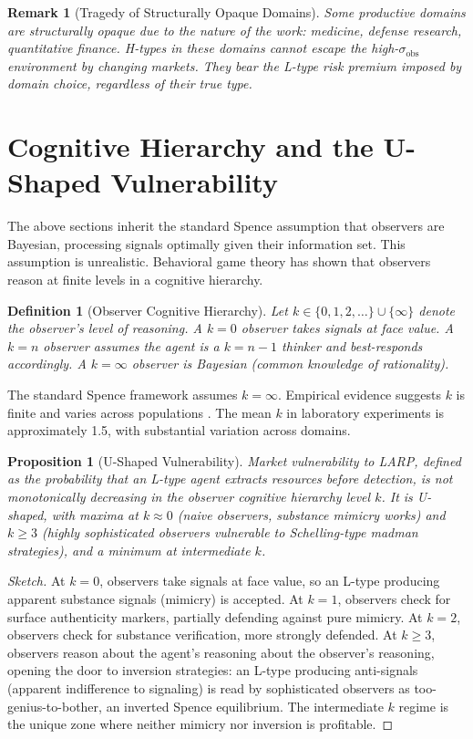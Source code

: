 \documentclass[11pt]{article}
\newtheorem{definition}{Definition}
\newtheorem{remark}{Remark}
\newtheorem{proposition}{Proposition}
\begin{document}
\begin{remark}[Tragedy of Structurally Opaque Domains]
Some productive domains are structurally opaque due to the nature of the work: medicine, defense research, quantitative finance. H-types in these domains cannot escape the high-$\sigma_{\mathrm{obs}}$ environment by changing markets. They bear the L-type risk premium imposed by domain choice, regardless of their true type.
\end{remark}

\section{Cognitive Hierarchy and the U-Shaped Vulnerability}

The above sections inherit the standard Spence assumption that observers are Bayesian, processing signals optimally given their information set. This assumption is unrealistic. Behavioral game theory has shown that observers reason at finite levels in a cognitive hierarchy.

\begin{definition}[Observer Cognitive Hierarchy]
\label{def:khierarchy}
Let $k \in \{0, 1, 2, \ldots\} \cup \{\infty\}$ denote the observer's level of reasoning. A $k = 0$ observer takes signals at face value. A $k = n$ observer assumes the agent is a $k = n-1$ thinker and best-responds accordingly. A $k = \infty$ observer is Bayesian (common knowledge of rationality).
\end{definition}

The standard Spence framework assumes $k = \infty$. Empirical evidence suggests $k$ is finite and varies across populations \cite{nagel1995, camerer2004}. The mean $k$ in laboratory experiments is approximately 1.5, with substantial variation across domains.

\begin{proposition}[U-Shaped Vulnerability]
\label{prop:ushape}
Market vulnerability to LARP, defined as the probability that an L-type agent extracts resources before detection, is not monotonically decreasing in the observer cognitive hierarchy level $k$. It is U-shaped, with maxima at $k \approx 0$ (naive observers, substance mimicry works) and $k \geq 3$ (highly sophisticated observers vulnerable to Schelling-type madman strategies), and a minimum at intermediate $k$.
\end{proposition}

\begin{proof}[Sketch]
At $k = 0$, observers take signals at face value, so an L-type producing apparent substance signals (mimicry) is accepted. At $k = 1$, observers check for surface authenticity markers, partially defending against pure mimicry. At $k = 2$, observers check for substance verification, more strongly defended. At $k \geq 3$, observers reason about the agent's reasoning about the observer's reasoning, opening the door to inversion strategies: an L-type producing anti-signals (apparent indifference to signaling) is read by sophisticated observers as too-genius-to-bother, an inverted Spence equilibrium. The intermediate $k$ regime is the unique zone where neither mimicry nor inversion is profitable.
\end{proof}
\end{document}
